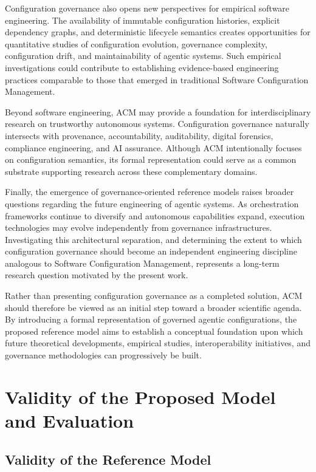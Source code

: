 \documentclass[10pt]{article}
\begin{document}
Configuration governance also opens new perspectives for empirical software engineering. The availability of immutable configuration histories, explicit dependency graphs, and deterministic lifecycle semantics creates opportunities for quantitative studies of configuration evolution, governance complexity, configuration drift, and maintainability of agentic systems. Such empirical investigations could contribute to establishing evidence-based engineering practices comparable to those that emerged in traditional Software Configuration Management.

Beyond software engineering, ACM may provide a foundation for interdisciplinary research on trustworthy autonomous systems. Configuration governance naturally intersects with provenance, accountability, auditability, digital forensics, compliance engineering, and AI assurance. Although ACM intentionally focuses on configuration semantics, its formal representation could serve as a common substrate supporting research across these complementary domains.

Finally, the emergence of governance-oriented reference models raises broader questions regarding the future engineering of agentic systems. As orchestration frameworks continue to diversify and autonomous capabilities expand, execution technologies may evolve independently from governance infrastructures. Investigating this architectural separation, and determining the extent to which configuration governance should become an independent engineering discipline analogous to Software Configuration Management, represents a long-term research question motivated by the present work.

Rather than presenting configuration governance as a completed solution, ACM should therefore be viewed as an initial step toward a broader scientific agenda. By introducing a formal representation of governed agentic configurations, the proposed reference model aims to establish a conceptual foundation upon which future theoretical developments, empirical studies, interoperability initiatives, and governance methodologies can progressively be built.

\section{Validity of the Proposed Model and Evaluation}
\subsection{Validity of the Reference Model}
\end{document}

